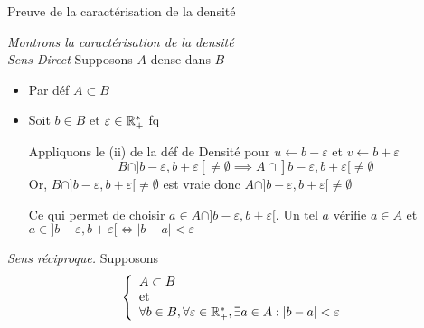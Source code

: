 \documentclass{article}
\begin{document}
  {Preuve de la caractérisation de la densité}

  \textit{Montrons la caractérisation de la densité}\\
  \emph{Sens Direct} Supposons $A$ dense dans $B$
  \begin{itemize}[label=\textemdash]
    \item Par déf $A \subset B$
    \item Soit $b \in B$ et $\varepsilon \in \mathbb R_+^*$ fq

          Appliquons le (ii) de la déf de Densité pour $u \leftarrow b - \varepsilon$ et $v \leftarrow b + \varepsilon$
          $$B \cap ]b - \varepsilon, b + \varepsilon[ \neq \emptyset \implies A \cap ]b - \varepsilon,  b + \varepsilon[ \neq \emptyset$$
            Or, $B \cap ]b - \varepsilon, b + \varepsilon[ \neq \emptyset$ est vraie
              donc $A \cap ]b - \varepsilon,  b + \varepsilon[ \neq \emptyset$

              Ce qui permet de choisir $a \in A \cap ]b - \varepsilon,  b + \varepsilon[$.
              Un tel $a$ vérifie $a \in A$ et $a \in ]b - \varepsilon,  b + \varepsilon[ \iff |b-a| < \varepsilon$
  \end{itemize}
  \bigbreak
  \noindent \emph{Sens réciproque.} Supposons
  \[
    \left\{\begin{array}{ll} A \subset B \\\mathrm{et}\\ \forall b \in B, \forall \varepsilon \in \mathbb R_+^*, \exists a \in A: |b-a|< \varepsilon \end{array}\right.
  \]


\end{question_kholle}
\end{document}
